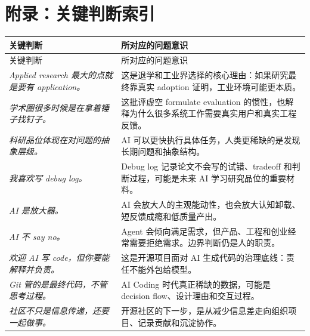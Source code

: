 \section*{附录：关键判断索引}

\begin{longtable}{>{\raggedright\arraybackslash}p{} >{\raggedright\arraybackslash}p{}}
\toprule
关键判断 & 所对应的问题意识 \\
\midrule
\endfirsthead
\toprule
关键判断 & 所对应的问题意识 \\
\midrule
\endhead
\textit{Applied research 最大的点就是要有 application。} & 这是退学和工业界选择的核心理由：如果研究最终靠真实 adoption 证明，工业环境可能更本质。 \\
\textit{学术圈很多时候是在拿着锤子找钉子。} & 这批评虚空 formulate evaluation 的惯性，也解释为什么很多系统工作需要真实用户和真实工程反馈。 \\
\textit{科研品位体现在对问题的抽象层级。} & AI 可以更快执行具体任务，人类更稀缺的是发现长期问题和抽象结构。 \\
\textit{我喜欢写 debug log。} & Debug log 记录论文不会写的试错、tradeoff 和判断过程，可能是未来 AI 学习研究品位的重要材料。 \\
\textit{AI 是放大器。} & AI 会放大人的主观能动性，也会放大认知卸载、短反馈成瘾和低质量产出。 \\
\textit{AI 不 say no。} & Agent 会倾向满足需求，但产品、工程和创业经常需要拒绝需求。边界判断仍是人的职责。 \\
\textit{欢迎 AI 写 code，但你要能解释并负责。} & 这是开源项目面对 AI 生成代码的治理底线：责任不能外包给模型。 \\
\textit{Git 管的是最终代码，不管思考过程。} & AI Coding 时代真正稀缺的数据，可能是 decision flow、设计理由和交互过程。 \\
\textit{社区不只是信息传递，还要一起做事。} & 开源社区的下一步，是从减少信息差走向组织项目、记录贡献和沉淀协作。 \\
\bottomrule
\end{longtable}


